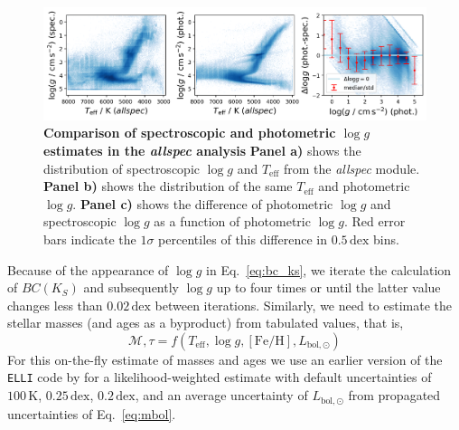 \documentclass[
  journal=pasa,
  manuscript=research-paper, %
  year=2024,
  volume=37
]{cup-journal}
\newcommand{\Teff}{$T_\mathrm{eff}$\xspace}
\newcommand{\logg}{$\log g$\xspace}
\begin{document}
\begin{figure}[ht]
\centering
\includegraphics[width=\textwidth]{figures/dlogg_spec_plx.png}
\caption{\textbf{Comparison of spectroscopic and photometric \logg estimates in the \textit{allspec} analysis}
\textbf{Panel a)} shows the distribution of spectroscopic \logg and \Teff from the \textit{allspec} module.
\textbf{Panel b)} shows the distribution of the same \Teff and photometric \logg.
\textbf{Panel c)} shows the difference of photometric \logg and spectroscopic \logg as a function of photometric \logg. Red error bars indicate the $1\sigma$ percentiles of this difference in $0.5\,\mathrm{dex}$ bins.} \label{fig:dlogg_spec_plx}
\end{figure}

Because of the appearance of $\log g$ in Eq.~\ref{eq:bc_ks}, we iterate the calculation of $BC(K_S)$ and subsequently $\log g$ up to four times or until the latter value changes less than $0.02\,\mathrm{dex}$ between iterations. Similarly, we need to estimate the stellar masses (and ages as a byproduct) from tabulated values, that is,
\begin{equation}
\mathcal{M}, \tau = f(T_\mathrm{eff}, \log g, \mathrm{[Fe/H]}, L_\mathrm{bol,\odot})
\label{eq:mass_age}
\end{equation}
For this on-the-fly estimate of masses and ages we use an earlier version of the \texttt{ELLI} code by \cite{Lin2018} for a likelihood-weighted estimate with default uncertainties of $100\,\mathrm{K}$, $0.25\,\mathrm{dex}$, $0.2\,\mathrm{dex}$, and an average uncertainty of $L_\mathrm{bol,\odot}$ from propagated uncertainties of Eq.~\ref{eq:mbol}.
\end{document}
